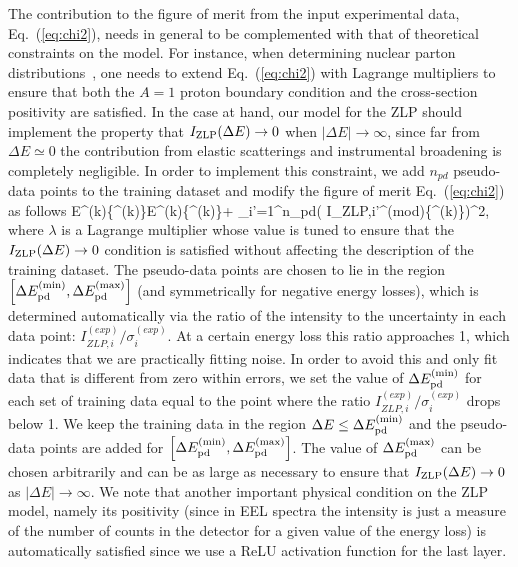 The contribution to the figure of merit from the input experimental data, Eq.~(\ref{eq:chi2}),
needs in general to be complemented with that of theoretical constraints on the model.
%
For instance, when determining nuclear parton distributions~\cite{AbdulKhalek:2020yuc}, one needs to
extend Eq.~(\ref{eq:chi2}) with Lagrange multipliers to ensure that both the $A=1$ proton boundary
condition and the cross-section positivity are satisfied.
%
In the case at hand, our model for the ZLP should implement the property that $I_{\rm ZLP}(\Delta E)\to 0$
when $|\Delta E| \to \infty$, since far from $\Delta E\simeq 0$ the contribution from elastic scatterings
and instrumental broadening is completely negligible.
%
In order to implement this constraint, we add $n_{pd}$ pseudo-data points to the training dataset and modify
the figure of merit Eq.~(\ref{eq:chi2}) as follows
\be
\label{eq:chi2modified}
E^{(k)}\lp \{\theta^{(k)}\}\rp \to E^{(k)}\lp \{\theta^{(k)}\}\rp +
\lambda \sum_{i'=1}^{n_{pd}}\left(
  I_{{\rm ZLP},i'}^{{\rm (mod)}}\lp \{\theta^{(k)}\}\rp \right)^2, 
  \ee
  where $\lambda$ is a Lagrange multiplier whose value is tuned to ensure that the $I_{\rm ZLP}(\Delta E)\to 0$
  condition
  is satisfied without affecting the description of the training dataset.
  The pseudo-data points are chosen to lie in the region $\left[ \Delta E_{\rm pd}^{\rm (min)},
  \Delta E_{\rm pd}^{\rm (max)}\right]$ (and symmetrically for negative energy losses),
  which is determined automatically via the ratio of the intensity to the uncertainty in each data point: 
  $I_{ZLP,i}^{(exp)} / \sigma_{i}^{(exp)}$. 
  At a certain energy loss this ratio approaches 1, which indicates that we are practically fitting noise. 
  In order to avoid this and only fit data that is different from zero within errors, we set the value
  of $\Delta E_{\rm pd}^{\rm (min)}$ for each set of training data equal to the point where the ratio
  $I_{ZLP,i}^{(exp)} / \sigma_{i}^{(exp)}$ drops below 1. 
  We keep the training data in the region $\Delta E \le \Delta E_{\rm pd}^{\rm (min)}$ and the pseudo-data
  points are added for $\left[ \Delta E_{\rm pd}^{\rm (min)}, \Delta E_{\rm pd}^{\rm (max)}\right]$. 
  The value of $\Delta E_{\rm pd}^{\rm (max)}$ can be chosen arbitrarily and can be as large as necessary
  to ensure that $I_{\rm ZLP}(\Delta E)\to 0$ as $|\Delta E| \to \infty$.
We note that another important physical condition on the ZLP model, namely its positivity
(since in EEL spectra the intensity is just a measure of the number of counts in the
detector for a given value of the energy loss) is automatically satisfied since
we use a ReLU activation function for the last layer.

